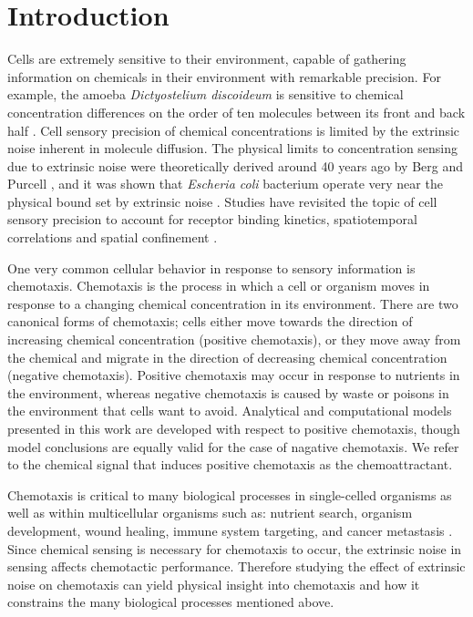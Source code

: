 
\chapter{Introduction}

\noindent
Cells are extremely sensitive to their environment, capable of gathering information on chemicals in their environment with remarkable precision. For example, the amoeba \textit{Dictyostelium discoideum} is sensitive to chemical concentration differences on the order of ten molecules between its front and back half \cite{song2006dictyostelium}. Cell sensory precision of chemical concentrations is limited by the extrinsic noise inherent in molecule diffusion. The physical limits to concentration sensing due to extrinsic noise were theoretically derived around 40 years ago by Berg and Purcell \cite{berg1977physics}, and it was shown that \textit{Escheria coli} bacterium operate very near the physical bound set by extrinsic noise \cite{lan2012energy}. Studies have revisited the topic of cell sensory precision to account for receptor binding kinetics, spatiotemporal correlations and spatial confinement
\cite{bialek2005physical, kaizu2014berg, bicknell2015limits}.

One very common cellular behavior in response to sensory information is chemotaxis. Chemotaxis is the process in which a cell or organism moves in response to a changing chemical concentration in its environment. There are two canonical forms of chemotaxis; cells either move towards the direction of increasing chemical concentration (positive chemotaxis), or they move away from the chemical and migrate in the direction of decreasing chemical concentration (negative chemotaxis). Positive chemotaxis may occur in response to nutrients in the environment, whereas negative chemotaxis is caused by waste or poisons in the environment that cells want to avoid. Analytical and computational models presented in this work are developed with respect to positive chemotaxis, though model conclusions are equally valid for the case of nagative chemotaxis. We refer to the chemical signal that induces positive chemotaxis as the chemoattractant.

Chemotaxis is critical to many biological processes in single-celled organisms as well as within multicellular organisms such as: nutrient search, organism development, wound healing, immune system targeting, and cancer metastasis \cite{iglesias2008navigating,roussos2011chemotaxis}. Since chemical sensing is necessary for chemotaxis to occur, the extrinsic noise in sensing affects chemotactic performance. Therefore studying the effect of extrinsic noise on chemotaxis can yield physical insight into chemotaxis and how it constrains the many biological processes mentioned above.

